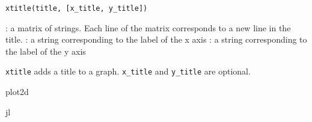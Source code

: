 
\begin{mandesc}
\end{mandesc}

\begin{calling_sequence}
\begin{verbatim}
xtitle(title, [x_title, y_title])
\end{verbatim}
\end{calling_sequence}
\begin{parameters}
  \begin{varlist}
    : a matrix of strings. Each line of the matrix corresponds to a new line
    in the title.
    : a string corresponding to the label of the x axis
    : a string corresponding to the label of the y axis
\end{varlist}
\end{parameters}

\begin{mandescription}
  \verb+xtitle+ adds a title to a graph. \verb+x_title+ and \verb+y_title+ are optional.
\end{mandescription}

\begin{examples}
  \begin{program}
  \end{program}
\end{examples}

\begin{manseealso}
  plot2d
\end{manseealso}

\begin{authors}
   jl
\end{authors}

